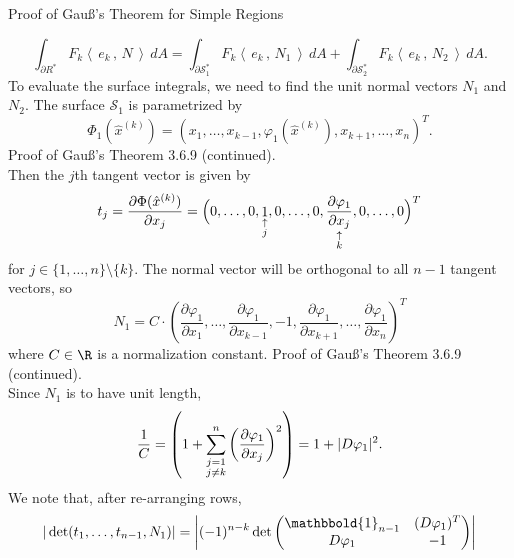 \documentclass[smaller,hyperref={CJKbookmarks=true}]{beamer}
\newcommand{\scp}[2]{\left\langle\,#1\,,\,#2\,\right\rangle} \newcommand{\scpp}{\langle\,\cdot\,,\,\cdot\,\rangle}
\begin{document}
\begin{frame}{Proof of Gau\ss's Theorem for Simple Regions}
\begin{spacing}{1.1}
\begin{equation}\label{3.6.3}
\int_{\partial R^*} F_k\scp{e_k}{N}\,dA=\int_{\partial\mathcal{S}_1^*}
F_k\scp{e_k}{N_1}\,dA+\int_{\partial\mathcal{S}_2^*}
F_k\scp{e_k}{N_2}\,dA.
\end{equation}
To evaluate the surface integrals, we need to find the unit normal vectors $N_1$ and $N_2$. The surface $\mathcal{S}_1$ is parametrized by
\[\Phi_1(\hat{x}^{(k)})=\left(x_1,\ldots,
x_{k-1},\varphi_1(\hat{x}^{(k)}),x_{k+1},\ldots,
x_n\right)^T.\]
\newpage
\alert{Proof of Gau\ss's Theorem 3.6.9 (continued).}\\
Then the $j$th tangent vector is given by
\[t_j=\frac{\partial\Phi(\hat{x}^{(k)})}{\partial x_j}=\Big(0,\ldots,0,\mathop{1}_{\begin{subarray}{c}
                                   \uparrow\\j
                                 \end{subarray}},0,\ldots,0,
\mathop{\frac{\partial\varphi_1}{\partial x_j}}_{\begin{subarray}{c}
         \uparrow\\k
       \end{subarray}},0,\ldots,0\Big)^T\]
for $j\in\{1,\ldots,n\}\setminus\{k\}$. The normal vector will be orthogonal to all $n-1$ tangent vectors, so
\[N_1=C\cdot\left(\frac{\partial\varphi_1}{\partial x_1},\ldots,\frac{\partial\varphi_1}{\partial x_{k-1}},-1,\frac{\partial\varphi_1}{\partial x_{k+1}},\ldots,\frac{\partial\varphi_1}{\partial x_n}\right)^T\]
where $C\in\R$ is a normalization constant.
\newpage
\alert{Proof of Gau\ss's Theorem 3.6.9 (continued).}\\
Since $N_1$ is to have unit length,
\[\frac{1}{C}=\left(1+\sum_{\begin{subarray}{c}
                              j=1\\j\neq k
                            \end{subarray}}^{n}\left(\frac{\partial\varphi_1}{\partial x_j}\right)^2\right)=1+|D\varphi_1|^2.\]
We note that, after re-arranging rows,
\begin{equation*}
  \begin{split}
     \vert\det(t_1,\ldots,t_{n-1},N_1)\vert &=\left|(-1)^{n-k}\det\begin{pmatrix}
                             \mathbbold{1}_{n-1} & (D\varphi_1)^T \\
                             D\varphi_1 & -1
                           \end{pmatrix}\right| \\

\end{split}
\end{equation*}
\end{spacing}
\end{frame}
\end{document}
